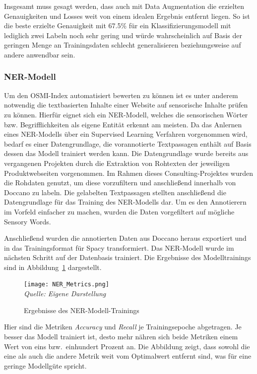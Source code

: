 Insgesamt muss gesagt werden, dass auch mit Data Augmentation die erzielten Genauigkeiten und Losses weit von einem idealen Ergebnis entfernt liegen.
So ist die beste erzielte Genauigkeit mit 67.5\% für ein Klassifizierungsmodell mit lediglich zwei Labeln noch sehr gering und würde wahrscheinlich auf Basis der geringen Menge an Trainingsdaten schlecht generalisieren beziehungsweise auf andere anwendbar sein.

\subsubsection{NER-Modell}
Um den \ac{OSMI}-Index automatisiert bewerten zu können ist es unter anderem notwendig die textbasierten Inhalte einer
Website auf sensorische Inhalte prüfen zu können.
Hierfür eignet sich ein \ac{NER}-Modell, welches die sensorischen Wörter bzw. Begrifflichkeiten als eigene Entität erkennt
am meisten.
Da das Anlernen eines NER-Modells über ein Supervised Learning Verfahren vorgenommen wird, bedarf es einer Datengrundlage,
die vorannotierte Textpassagen enthält auf Basis dessen das Modell trainiert werden kann.
Die Datengrundlage wurde bereits aus vergangenen Projekten durch die Extraktion von Rohtexten der jeweiligen Produktwebseiten
vorgenommen.
Im Rahmen dieses Consulting-Projektes wurden die Rohdaten genutzt, um diese vorzufiltern und anschließend innerhalb von
Doccano zu labeln.
Die gelabelten Textpassagen stellten anschließend die Datengrundlage für das Training des \ac{NER}-Modells dar.
Um es den Annotierern im Vorfeld einfacher zu machen, wurden die Daten vorgefiltert auf mögliche Sensory Words.

Anschließend wurden die annotierten Daten aus Doccano heraus exportiert und in das Trainingsformat für Spacy transformiert.
Das \ac{NER}-Modell wurde im nächsten Schritt auf der Datenbasis trainiert.
Die Ergebnisse des Modelltrainings sind in Abbildung~\ref{fig:NER_Metrics} dargestellt.

\begin{figure}[H]
	\centering
	\caption[]{Ergebnisse des NER-Modell-Trainings}\label{fig:NER_Metrics}
	\texttt{[image: NER\_Metrics.png]}
	\\
	\textit{Quelle: Eigene Darstellung}
\end{figure}

Hier sind die Metriken \textit{Accuracy} und \textit{Recall} je Trainingsepoche abgetragen.
Je besser das Modell trainiert ist, desto mehr nähren sich beide Metriken einem Wert von eins bzw.\ einhundert Prozent an.
Die Abbildung zeigt, dass sowohl die eine als auch die andere Metrik weit vom Optimalwert entfernt sind, was für eine
geringe Modellgüte spricht.

